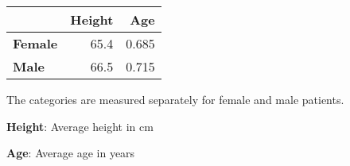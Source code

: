 \documentclass[11pt]{article}
\author{Data to Paper}
\begin{document}
\newsavebox{\mytablebox} %

\begin{lrbox}{\mytablebox}
 \begin{tabular}{lrr}
\toprule
{} &  Height &   Age \\
\midrule
\textbf{Female} &    65.4 & 0.685 \\
\textbf{Male  } &    66.5 & 0.715 \\
\bottomrule
\end{tabular}%
\end{lrbox}

\begin{table}[h]
\caption{Average height and age stratified by sex}
\label{table:patient_characteristics}
\begin{threeparttable}
\renewcommand{\TPTminimum}{\linewidth}
\begin{tablenotes}
\footnotesize
\item The categories are measured separately for female and male patients.
\item \textbf{Height}: Average height in cm
\item \textbf{Age}: Average age in years
\end{tablenotes}
\end{threeparttable}
\end{table}


\end{document}
